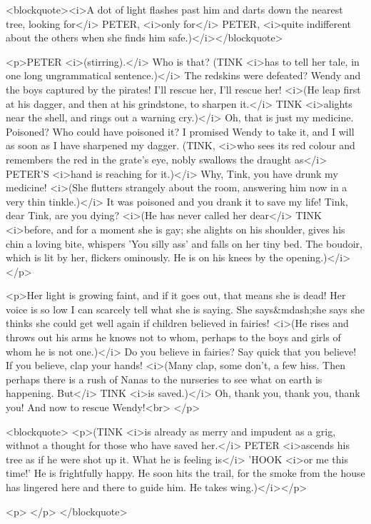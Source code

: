 <blockquote><i>A dot of light flashes past him and darts down the
nearest tree, looking for</i> PETER, <i>only for</i> PETER, <i>quite
indifferent about the others when she finds him
safe.)</i></blockquote>

<p>PETER <i>(stirring).</i> Who is that? (TINK <i>has to tell her
tale, in one long ungrammatical sentence.)</i> The redskins were
defeated? Wendy and the boys captured by the pirates! I'll rescue
her, I'll rescue her! <i>(He leap first at his dagger, and then at
his grindstone, to sharpen it.</i> TINK <i>alights near the shell,
and rings out a warning cry.)</i> Oh, that is just my medicine.
Poisoned? Who could have poisoned it? I promised Wendy to take it,
and I will as soon as I have sharpened my dagger. (TINK, <i>who sees
its red colour and remembers the red in the grate's eye, nobly
swallows the draught as</i> PETER'S <i>hand is reaching for it.)</i>
Why, Tink, you have drunk my medicine! <i>(She flutters strangely
about the room, answering him now in a very thin tinkle.)</i> It was
poisoned and you drank it to save my life! Tink, dear Tink, are you
dying? <i>(He has never called her dear</i> TINK <i>before, and for a
moment she is gay; she alights on his shoulder, gives his chin a
loving bite, whispers 'You silly ass' and falls on her tiny bed. The
boudoir, which is lit by her, flickers ominously. He is on his knees
by the opening.)</i></p>

<p>Her light is growing faint, and if it goes out, that means she is
dead! Her voice is so low I can scarcely tell what she is saying. She
says&mdash;she says she thinks she could get well again if children
believed in fairies! <i>(He rises and throws out his arms he knows
not to whom, perhaps to the boys and girls of whom he is not
one.)</i> Do you believe in fairies? Say quick that you believe! If
you believe, clap your hands! <i>(Many clap, some don't, a few hiss.
Then perhaps there is a rush of Nanas to the nurseries to see what on
earth is happening. But</i> TINK <i>is saved.)</i> Oh, thank you,
thank you, thank you! And now to rescue Wendy!<br>
</p>

<blockquote>
<p>(TINK <i>is already as merry and impudent as a grig, withnot a
thought for those who have saved her.</i> PETER <i>ascends his tree
as if he were shot up it. What he is feeling is</i> 'HOOK <i>or me
this time!' He is frightfully happy. He soon hits the trail, for the
smoke from the house has lingered here and there to guide him. He
takes wing.)</i></p>

<p> </p>
</blockquote>
